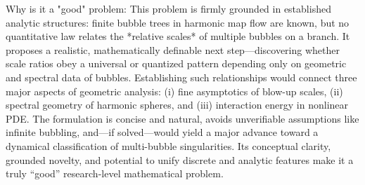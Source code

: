 Why is it a "good" problem:  
This problem is firmly grounded in established analytic structures: finite bubble trees in harmonic map flow are known, but no quantitative law relates the *relative scales* of multiple bubbles on a branch. It proposes a realistic, mathematically definable next step—discovering whether scale ratios obey a universal or quantized pattern depending only on geometric and spectral data of bubbles. Establishing such relationships would connect three major aspects of geometric analysis: (i) fine asymptotics of blow-up scales, (ii) spectral geometry of harmonic spheres, and (iii) interaction energy in nonlinear PDE. The formulation is concise and natural, avoids unverifiable assumptions like infinite bubbling, and—if solved—would yield a major advance toward a dynamical classification of multi-bubble singularities. Its conceptual clarity, grounded novelty, and potential to unify discrete and analytic features make it a truly “good” research-level mathematical problem.